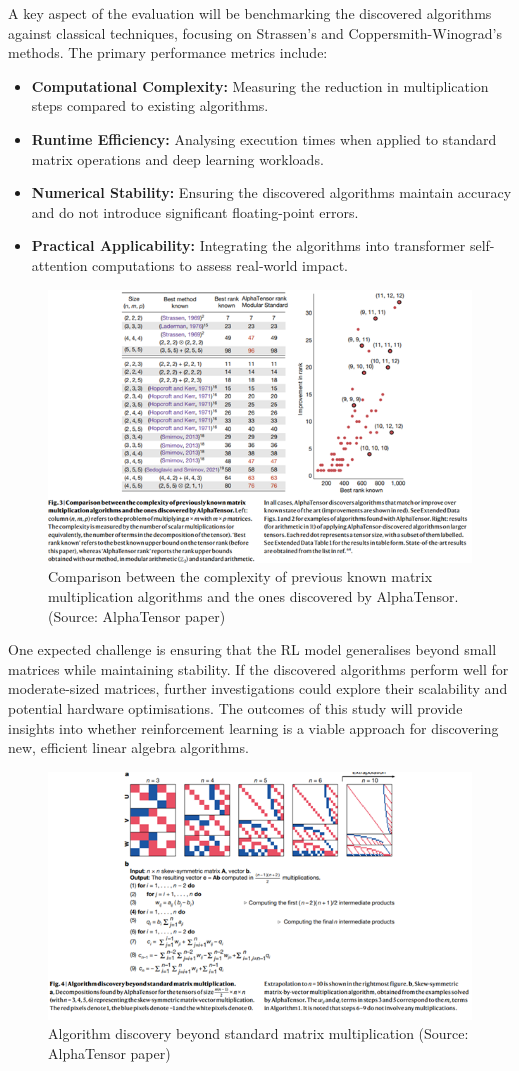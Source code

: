 \documentclass{article}
\begin{document}
A key aspect of the evaluation will be benchmarking the discovered algorithms against classical techniques, focusing on Strassen's and Coppersmith-Winograd's methods. The primary performance metrics include:  

\begin{itemize}
    \item \textbf{Computational Complexity:} Measuring the reduction in multiplication steps compared to existing algorithms.
    \item \textbf{Runtime Efficiency:} Analysing execution times when applied to standard matrix operations and deep learning workloads.
    \item \textbf{Numerical Stability:} Ensuring the discovered algorithms maintain accuracy and do not introduce significant floating-point errors.
    \item \textbf{Practical Applicability:} Integrating the algorithms into transformer self-attention computations to assess real-world impact.
\end{itemize}

\begin{figure}[H]
    \centering
    \includegraphics[width=0.6\linewidth]{Picture4.png}
    \caption{Comparison between the complexity of previous known matrix multiplication algorithms and the ones discovered by AlphaTensor. (Source: AlphaTensor paper)}
    \label{fig:comparison-alphatensor}
\end{figure}

One expected challenge is ensuring that the RL model generalises beyond small matrices while maintaining stability. If the discovered algorithms perform well for moderate-sized matrices, further investigations could explore their scalability and potential hardware optimisations. The outcomes of this study will provide insights into whether reinforcement learning is a viable approach for discovering new, efficient linear algebra algorithms.

\begin{figure}[H]
    \centering
    \includegraphics[width=0.6\linewidth]{Picture5.png}
    \caption{Algorithm discovery beyond standard matrix multiplication (Source: AlphaTensor paper)}
    \label{fig:standard-matrix}
\end{figure}
\end{document}

